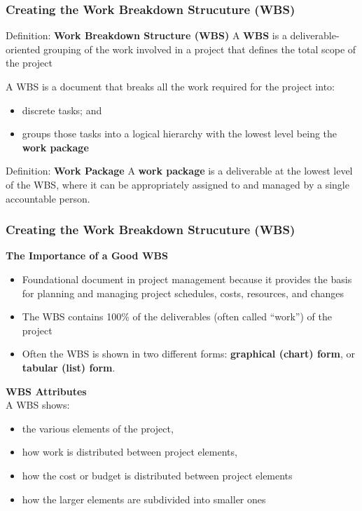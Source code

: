 \documentclass[aspectratio=169]{beamer}
\begin{document}

\begin{frame}
\frametitle{Creating the Work Breakdown Strucuture (WBS)}
\begin{block}{Definition: \textbf{Work Breakdown Structure (WBS)}}
A \textbf{WBS} is a deliverable-oriented grouping of the work involved in a project that defines the total scope of the project
\end{block}
A WBS is a document that breaks all the work required for the project into:
\begin{itemize}
\item discrete tasks; and
\item groups those tasks into a logical hierarchy with the lowest level being the \textbf{work package}
\end{itemize}

\begin{block}{Definition: \textbf{Work Package}}
A \textbf{work package} is a deliverable at the lowest level of the WBS, where it can be appropriately assigned to and managed by a single accountable person.
\end{block}
\end{frame}


\begin{frame}
\frametitle{Creating the Work Breakdown Strucuture (WBS)}
\textbf{The Importance of a Good WBS}
\vspace{0.25cm}
\small
\begin{itemize} 
\item Foundational document in project management because it provides the basis for planning and managing project schedules, costs, resources, and changes
\item The WBS contains 100\% of the deliverables (often called “work”) of the project
\item Often the WBS is shown in two different forms: \textbf{graphical (chart) form}, or \textbf{tabular (list) form}.
\end{itemize}
\vspace{0.5cm}
\textbf{WBS Attributes}\\
\vspace{0.25cm}
\small A WBS shows:
\begin{itemize}
\item the various elements of the project, 
\item how work is distributed between project elements,
\item how the cost or budget is distributed between project elements
\item how the larger elements are subdivided into smaller ones
\end{itemize}
\end{frame}
\end{document}
